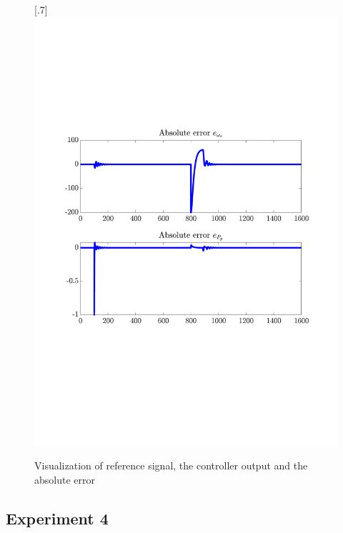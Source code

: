 \begin{figure}[H]
[.7\textwidth]{\includegraphics[width=1\linewidth, scale=1, trim=55 230 55 120,clip]{fig/Open_loop/exp_3_error.pdf}}
    \caption{Visualization of reference signal, the controller output and the absolute error}
    \label{fig:app:cl_results:exp3}
\end{figure}

\subsection{Experiment 4}

